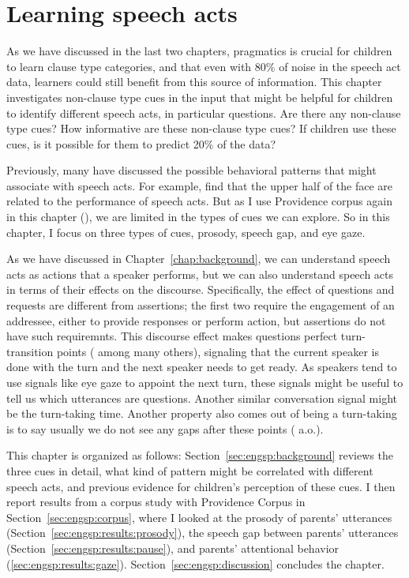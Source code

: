 \chapter{Learning speech acts}
\label{chap:eng-sp}
As we have discussed in the last two chapters, pragmatics is crucial for children to learn clause type categories, and that even with 80\% of noise in the speech act data, learners could still benefit from this source of information. This chapter investigates non-clause type cues in the input that might be helpful for children to identify different speech acts, in particular questions. Are there any non-clause type cues? How informative are these non-clause type cues? If children use these cues, is it possible for them to predict 20\% of the data? 

Previously, many have discussed the possible behavioral patterns that might associate with speech acts. For example, \textcite{domaneschi2017facial} find that the upper half of the face are related to the performance of speech acts. But as I use Providence corpus again in this chapter (\citealt{ProvidenceCorpus}), we are limited in the types of cues we can explore. So in this chapter, I focus on three types of cues, prosody, speech gap, and eye gaze. 


As we have discussed in Chapter~\ref{chap:background}, we can understand speech acts as actions that a speaker performs, but we can also understand speech acts in terms of their effects on the discourse. Specifically, the effect of questions and requests are different from assertions; the first two require the engagement of an addressee, either to provide responses or perform action, but assertions do not have such requiremnts. This discourse effect makes questions perfect turn-transition points (\cite{duncan1972turn} among many others), signaling that the current speaker is done with the turn and the next speaker needs to get ready. As speakers tend to use signals like eye gaze to appoint the next turn, these signals might be useful to tell us which utterances are questions. Another similar conversation signal might be the turn-taking time. Another property also comes out of being a turn-taking is to say usually we do not see any gaps after these points (\citealt{tice2011turn} a.o.).   

This chapter is organized as follows: Section~\ref{sec:engsp:background} reviews the three cues in detail, what kind of pattern might be correlated with different speech acts, and previous evidence for children's perception of these cues. I then report results from a corpus study with Providence Corpus in Section~\ref{sec:engsp:corpus}, where I looked at the prosody of parents' utterances (Section~\ref{sec:engsp:results:prosody}), the speech gap between parents' utterances (Section~\ref{sec:engsp:results:pause}), and parents' attentional behavior (\ref{sec:engsp:results:gaze}).
Section~\ref{sec:engsp:discussion} concludes the chapter.


